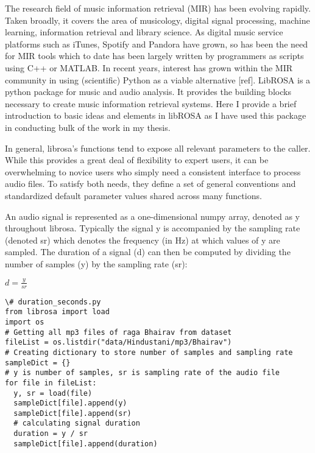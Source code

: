 \doublespacing
\setlength{\parindent}{1cm}

The research field of music information retrieval (MIR) has been evolving rapidly. Taken broadly, it covers the area of musicology, digital signal processing, machine learning, information retrieval and library science. As digital music service platforms such as iTunes, Spotify and Pandora have grown, so has been the need for MIR tools which to date has been largely written by programmers as scripts using C++ or MATLAB. In recent years, interest has grown within the MIR community in using (scientific) Python as a viable alternative [ref]. LibROSA is a python package for music and audio analysis. It provides the building blocks necessary to create music information retrieval systems. Here I provide a brief introduction to basic ideas and elements in libROSA as I have used this package in conducting bulk of the work in my thesis.
\par
In general, librosa’s functions tend to expose all relevant parameters to the caller. While this provides a great deal of flexibility to expert users, it can be overwhelming to novice users who simply need a consistent interface to process audio files. To satisfy both needs, they define a set of general conventions and standardized default parameter values shared across many functions.
\par
An audio signal is represented as a one-dimensional numpy array, denoted as y throughout librosa. Typically the signal y is accompanied by the sampling rate (denoted sr) which denotes the frequency (in Hz) at which values of y are sampled. The duration of a signal (d) can then be computed by dividing the number of samples (y) by the sampling rate (sr): \par
\begin{center}
  $ d = \frac{y}{sr} $
\end{center}

\begin{lstlisting}
\# duration_seconds.py
from librosa import load
import os
# Getting all mp3 files of raga Bhairav from dataset
fileList = os.listdir("data/Hindustani/mp3/Bhairav")
# Creating dictionary to store number of samples and sampling rate
sampleDict = {}
# y is number of samples, sr is sampling rate of the audio file
for file in fileList:
  y, sr = load(file)
  sampleDict[file].append(y)
  sampleDict[file].append(sr)
  # calculating signal duration
  duration = y / sr
  sampleDict[file].append(duration) 
\end{lstlisting}
